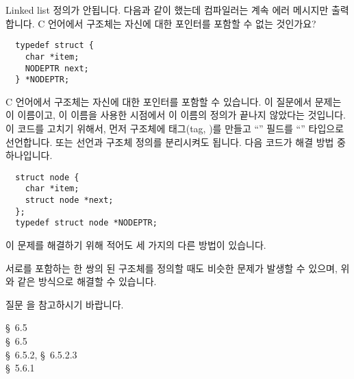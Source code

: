 \begin{faq}
	Linked list 정의가 안됩니다.  다음과 같이 했는데 컴파일러는
	계속 에러 메시지만 출력합니다.  C 언어에서 구조체는 자신에 대한
	포인터를 포함할 수 없는 것인가요?
\begin{verbatim}
  typedef struct {
    char *item;
    NODEPTR next;
  } *NODEPTR;
\end{verbatim}

\A
	C 언어에서 구조체는 자신에 대한 포인터를 포함할 수 있습니다.
	이 질문에서 문제는 이  이름이고, 이 
	이름을 사용한 시점에서 이 이름의 정의가 끝나지 않았다는 것입니다.
	이 코드를 고치기 위해서, 먼저 구조체에 태그(tag, )를
	만들고 ``'' 필드를 ``'' 타입으로 
	선언합니다.  또는  선언과 구조체 정의를 분리시켜도
	됩니다.  다음 코드가 해결 방법 중 하나입니다.

\begin{verbatim}
  struct node {
    char *item;
    struct node *next;
  };
  typedef struct node *NODEPTR;
\end{verbatim}

	이 문제를 해결하기 위해 적어도 세 가지의 다른 방법이 있습니다.

	서로를 포함하는 한 쌍의 된 구조체를 정의할 때도 비슷한
	문제가 발생할 수 있으며, 위와 같은 방식으로 해결할 수 있습니다.

	질문 을 참고하시기 바랍니다.

\R
	\cite{kr1} \S\ 6.5  \\
	\cite{kr2} \S\ 6.5  \\
	\cite{c89} \S\ 6.5.2, \S\ 6.5.2.3 \\
	\cite{hs} \S\ 5.6.1 
\end{faq}

